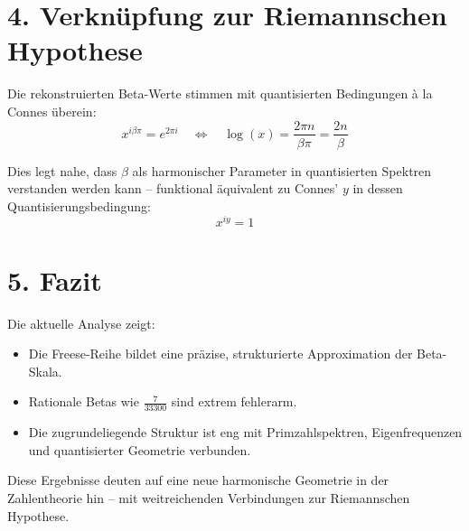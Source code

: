 \documentclass[a4paper,11pt]{article}
\begin{document}
\section*{4. Verknüpfung zur Riemannschen Hypothese}

Die rekonstruierten Beta-Werte stimmen mit quantisierten Bedingungen à la Connes überein:
\[
x^{i\beta \pi} = e^{2\pi i}
\quad \Leftrightarrow \quad
\log(x) = \frac{2\pi n}{\beta \pi} = \frac{2n}{\beta}
\]

Dies legt nahe, dass $\beta$ als harmonischer Parameter in quantisierten Spektren verstanden werden kann – funktional äquivalent zu Connes' $y$ in dessen Quantisierungsbedingung:
\[
x^{iy} = 1
\]

\section*{5. Fazit}

Die aktuelle Analyse zeigt:
\begin{itemize}
    \item Die Freese-Reihe bildet eine präzise, strukturierte Approximation der Beta-Skala.
    \item Rationale Betas wie $\frac{7}{33300}$ sind extrem fehlerarm.
    \item Die zugrundeliegende Struktur ist eng mit Primzahlspektren, Eigenfrequenzen und quantisierter Geometrie verbunden.
\end{itemize}

Diese Ergebnisse deuten auf eine neue harmonische Geometrie in der Zahlentheorie hin – mit weitreichenden Verbindungen zur Riemannschen Hypothese.
\end{document}
